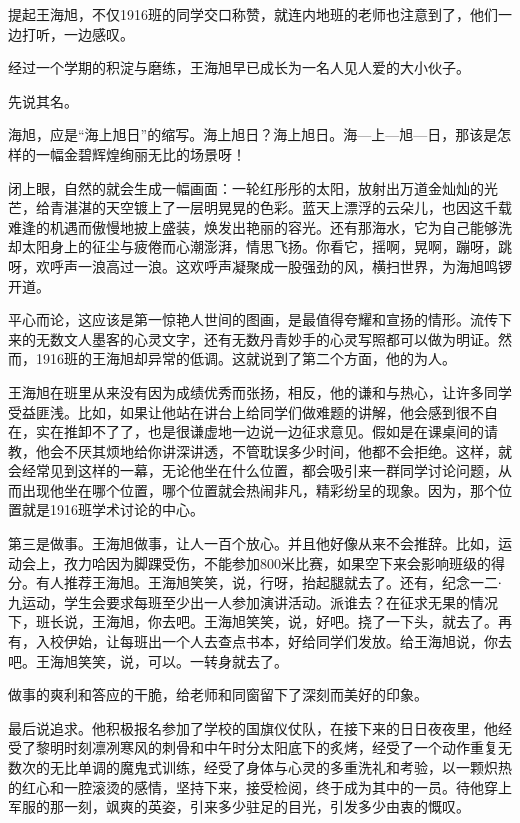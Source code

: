 \documentclass[openany]{ctexbook}
\begin{document}
提起王海旭，不仅1916班的同学交口称赞，就连内地班的老师也注意到了，他们一边打听，一边感叹。

经过一个学期的积淀与磨练，王海旭早已成长为一名人见人爱的大小伙子。

先说其名。

海旭，应是``海上旭日''的缩写。海上旭日？海上旭日。海---上---旭---日，那该是怎样的一幅金碧辉煌绚丽无比的场景呀！

闭上眼，自然的就会生成一幅画面：一轮红彤彤的太阳，放射出万道金灿灿的光芒，给青湛湛的天空镀上了一层明晃晃的色彩。蓝天上漂浮的云朵儿，也因这千载难逢的机遇而傲慢地披上盛装，焕发出艳丽的容光。还有那海水，它为自己能够洗却太阳身上的征尘与疲倦而心潮澎湃，情思飞扬。你看它，摇啊，晃啊，蹦呀，跳呀，欢呼声一浪高过一浪。这欢呼声凝聚成一股强劲的风，横扫世界，为海旭鸣锣开道。

平心而论，这应该是第一惊艳人世间的图画，是最值得夸耀和宣扬的情形。流传下来的无数文人墨客的心灵文字，还有无数丹青妙手的心灵写照都可以做为明证。然而，1916班的王海旭却异常的低调。这就说到了第二个方面，他的为人。

王海旭在班里从来没有因为成绩优秀而张扬，相反，他的谦和与热心，让许多同学受益匪浅。比如，如果让他站在讲台上给同学们做难题的讲解，他会感到很不自在，实在推卸不了了，也是很谦虚地一边说一边征求意见。假如是在课桌间的请教，他会不厌其烦地给你讲深讲透，不管耽误多少时间，他都不会拒绝。这样，就会经常见到这样的一幕，无论他坐在什么位置，都会吸引来一群同学讨论问题，从而出现他坐在哪个位置，哪个位置就会热闹非凡，精彩纷呈的现象。因为，那个位置就是1916班学术讨论的中心。

第三是做事。王海旭做事，让人一百个放心。并且他好像从来不会推辞。比如，运动会上，孜力哈因为脚踝受伤，不能参加800米比赛，如果空下来会影响班级的得分。有人推荐王海旭。王海旭笑笑，说，行呀，抬起腿就去了。还有，纪念一二∙九运动，学生会要求每班至少出一人参加演讲活动。派谁去？在征求无果的情况下，班长说，王海旭，你去吧。王海旭笑笑，说，好吧。挠了一下头，就去了。再有，入校伊始，让每班出一个人去查点书本，好给同学们发放。给王海旭说，你去吧。王海旭笑笑，说，可以。一转身就去了。

做事的爽利和答应的干脆，给老师和同窗留下了深刻而美好的印象。

最后说追求。他积极报名参加了学校的国旗仪仗队，在接下来的日日夜夜里，他经受了黎明时刻凛冽寒风的刺骨和中午时分太阳底下的炙烤，经受了一个动作重复无数次的无比单调的魔鬼式训练，经受了身体与心灵的多重洗礼和考验，以一颗炽热的红心和一腔滚烫的感情，坚持下来，接受检阅，终于成为其中的一员。待他穿上军服的那一刻，飒爽的英姿，引来多少驻足的目光，引发多少由衷的慨叹。
\end{document}
